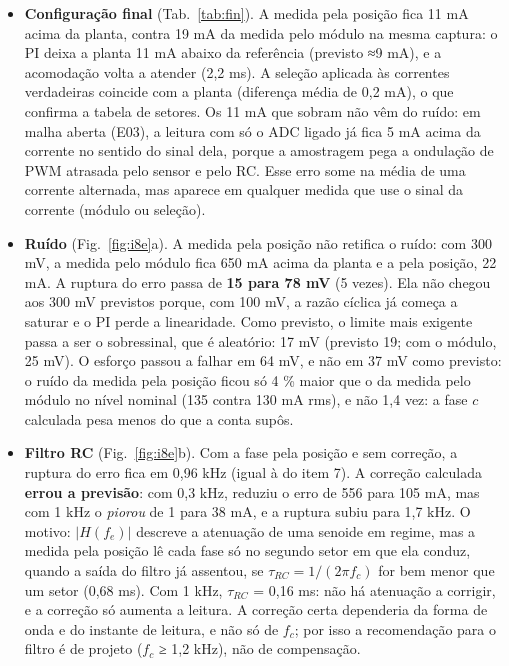 \documentclass[10pt,a4paper]{article}
\begin{document}
\begin{itemize}
\item \textbf{Configuração final} (Tab.~\ref{tab:fin}). A medida pela posição fica 11 mA acima da planta, contra 19 mA da medida pelo módulo na mesma captura: o PI deixa a planta 11 mA abaixo da referência (previsto ≈9 mA), e a acomodação volta a atender (2,2 ms). A seleção aplicada às correntes verdadeiras coincide com a planta (diferença média de 0,2 mA), o que confirma a tabela de setores. Os 11 mA que sobram não vêm do ruído: em malha aberta (E03), a leitura com só o ADC ligado já fica 5 mA acima da corrente no sentido do sinal dela, porque a amostragem pega a ondulação de PWM atrasada pelo sensor e pelo RC. Esse erro some na média de uma corrente alternada, mas aparece em qualquer medida que use o sinal da corrente (módulo ou seleção).
\item \textbf{Ruído} (Fig.~\ref{fig:i8e}a). A medida pela posição não retifica o ruído: com 300 mV, a medida pelo módulo fica 650 mA acima da planta e a pela posição, 22 mA. A ruptura do erro passa de \textbf{15 para 78 mV} (5 vezes). Ela não chegou aos 300 mV previstos porque, com 100 mV, a razão cíclica já começa a saturar e o PI perde a linearidade. Como previsto, o limite mais exigente passa a ser o sobressinal, que é aleatório: 17 mV (previsto 19; com o módulo, 25 mV). O esforço passou a falhar em 64 mV, e não em 37 mV como previsto: o ruído da medida pela posição ficou só 4 \% maior que o da medida pelo módulo no nível nominal (135 contra 130 mA rms), e não 1,4 vez: a fase $c$ calculada pesa menos do que a conta supôs.
\item \textbf{Filtro RC} (Fig.~\ref{fig:i8e}b). Com a fase pela posição e sem correção, a ruptura do erro fica em 0,96 kHz (igual à do item 7). A correção calculada \textbf{errou a previsão}: com 0,3 kHz, reduziu o erro de 556 para 105 mA, mas com 1 kHz o \emph{piorou} de 1 para 38 mA, e a ruptura subiu para 1,7 kHz. O motivo: $|H(f_e)|$ descreve a atenuação de uma senoide em regime, mas a medida pela posição lê cada fase só no segundo setor em que ela conduz, quando a saída do filtro já assentou, se $\tau_{RC} = 1/(2\pi f_c)$ for bem menor que um setor (0,68 ms). Com 1 kHz, $\tau_{RC}$ = 0,16 ms: não há atenuação a corrigir, e a correção só aumenta a leitura. A correção certa dependeria da forma de onda e do instante de leitura, e não só de $f_c$; por isso a recomendação para o filtro é de projeto ($f_c$ ≥ 1,2 kHz), não de compensação.
\end{itemize}
\end{document}
